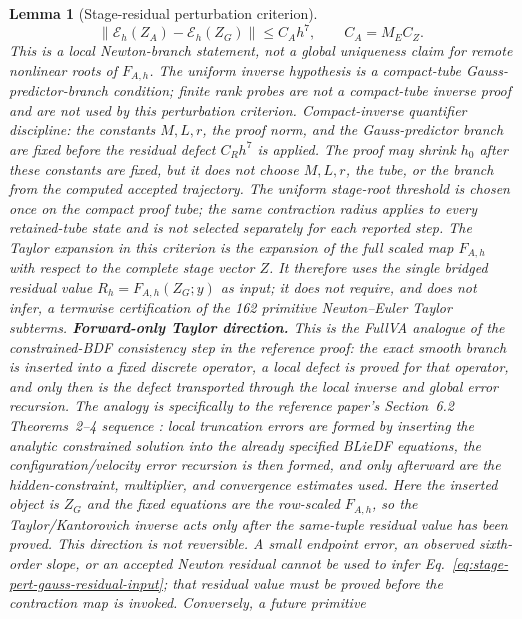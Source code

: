 \documentclass[preprint,12pt]{elsarticle}
\newtheorem{lemma}{Lemma}
\begin{document}
\begin{lemma}[Stage-residual perturbation criterion]
\begin{equation}
\label{eq:stage-pert-endpoint-bound}
  \|\mathcal E_h(Z_A)-\mathcal E_h(Z_G)\|
  \le C_Ah^7,\qquad C_A=M_EC_Z .
\end{equation}
This is a local Newton-branch statement, not a global uniqueness claim for
remote nonlinear roots of $F_{A,h}$. The uniform inverse hypothesis is a
compact-tube Gauss-predictor-branch condition; finite rank probes are not a
compact-tube inverse proof and are not used by this perturbation criterion.
Compact-inverse quantifier discipline: the constants \(M,L,r\), the proof norm,
and the Gauss-predictor branch are fixed before the residual defect
\(C_Rh^7\) is applied. The proof may shrink \(h_0\) after these constants are
fixed, but it does not choose \(M,L,r\), the tube, or the branch from the
computed accepted trajectory. The uniform stage-root threshold is chosen once
on the compact proof tube; the same contraction radius applies to every
retained-tube state and is not selected separately for each reported step.
The Taylor expansion in this criterion is the expansion of the full scaled
map \(F_{A,h}\) with respect to the complete stage vector \(Z\).  It therefore
uses the single bridged residual value \(R_h=F_{A,h}(Z_G;y)\) as input; it does
not require, and does not infer, a termwise certification of the 162 primitive
Newton--Euler Taylor subterms.
\noindent\textbf{Forward-only Taylor direction.}
This is the FullVA analogue of the constrained-BDF consistency step in the
reference proof: the exact smooth branch is inserted into a fixed discrete
operator, a local defect is proved for that operator, and only then is the
defect transported through the local inverse and global error recursion.  The
analogy is specifically to the reference paper's Section~6.2
Theorems~2--4 sequence \cite{wieloch2021bdf}: local truncation errors are
formed by inserting the analytic constrained solution into the already
specified BLieDF equations, the configuration/velocity error recursion is then
formed, and only afterward are the hidden-constraint, multiplier, and
convergence estimates used.  Here the inserted object is \(Z_G\) and the fixed equations are the
row-scaled \(F_{A,h}\), so the Taylor/Kantorovich inverse acts only after the
same-tuple residual value has been proved.
This direction is not reversible.  A small endpoint error, an observed sixth-order
slope, or an accepted Newton residual cannot be used to infer
Eq.~\eqref{eq:stage-pert-gauss-residual-input}; that residual value must be
proved before the contraction map is invoked.  Conversely, a future primitive

\end{lemma}
\end{document}
